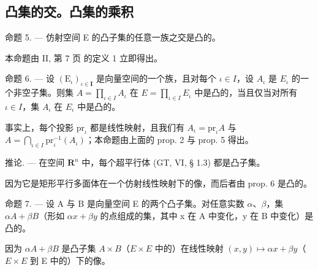 \subsection{凸集的交。凸集的乘积}

命题 5. --- 仿射空间 E 的凸子集的任意一族之交是凸的。

本命题由 II, 第 7 页 的定义 1 立即得出。

命题 6. --- 设 \((\mathrm{E}_{\iota})_{\iota\in\mathbf{I}}\) 是向量空间的一个族，且对每个 \(\iota\in I\)，设 \(A_{\iota}\) 是 \(E_{\iota}\) 的一个非空子集。则集 \(A=\prod_{\iota\in I}A_{\iota}\) 在 \(E=\prod_{\iota\in I}E_{\iota}\) 中是凸的，当且仅当对所有 \(\iota\in I\)，集 \(A_{\iota}\) 在 \(E_{\iota}\) 中是凸的。

事实上，每个投影 \(\mathrm{pr}_{\iota}\) 都是线性映射，且我们有 \(A_{\iota} = \mathrm{pr}_{\iota}A\) 与 \(A = \bigcap_{\iota \in I} \mathrm{pr}_{\iota}^{-1}(A_{\iota})\)；本命题由上面的 prop. 2 与 prop. 5 得出。

推论. --- 在空间 \(\mathbf{R}^n\) 中，每个超平行体 (GT, VI, § 1.3) 都是凸子集。

因为它是矩形平行多面体在一个仿射线性映射下的像，而后者由 prop. 6 是凸的。

命题 7. --- 设 A 与 B 是向量空间 E 的两个凸子集。对任意实数 \(\alpha\)、\(\beta\)，集 \(\alpha A + \beta B\)（形如 \(\alpha x + \beta y\) 的点组成的集，其中 x 在 A 中变化，y 在 B 中变化）是凸的。

因为 \(\alpha A + \beta B\) 是凸子集 \(A \times B\)（\(E \times E\) 中的）在线性映射 \((x, y) \mapsto \alpha x + \beta y\)（\(E \times E\) 到 E 中的）下的像。

